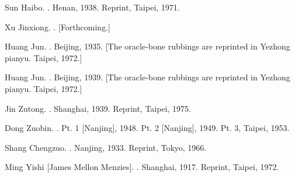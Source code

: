 \begin{list}{}
  \item[Wenlu] Sun Haibo. . Henan, 1938. Reprint, Taipei, 1971.
  \item[White] Xu Jinxiong. . [Forthcoming.]
  \item[Yechu] Huang Jun. . Beijing, 1935. [The oracle-bone rubbings are reprinted in Yezhong pianyu. Taipei, 1972.]
  \item[Yesan] Huang Jun. . Beijing, 1939. [The oracle-bone rubbings are reprinted in Yezhong pianyu. Taipei, 1972.]
  \item[Yizhu] Jin Zutong. . Shanghai, 1939. Reprint, Taipei, 1975.
  \item[Yibian] Dong Zuobin. . Pt. 1 [Nanjing], 1948. Pt. 2 [Nanjing], 1949. Pt. 3, Taipei, 1953.
  \item[Yicun] Shang Chengzuo. . Nanjing, 1933. Reprint, Tokyo, 1966.
  \item[Yinxu] Ming Yishi [James Mellon Menzies]. . Shanghai, 1917. Reprint, Taipei, 1972.
\end{list}
